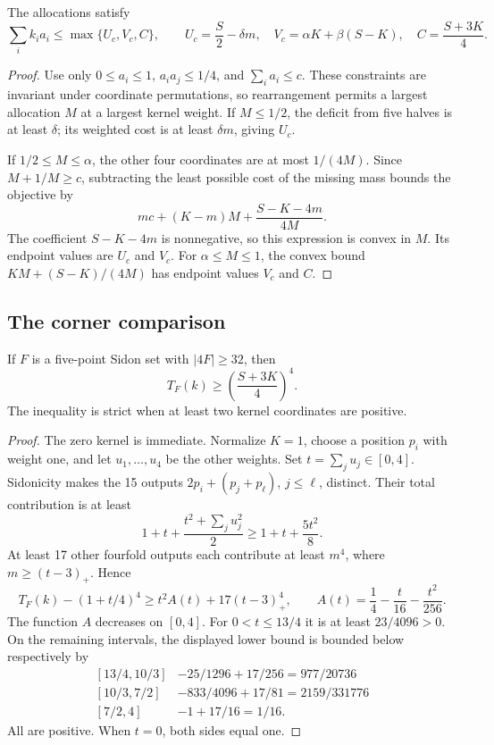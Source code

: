 \begin{lemma}\label{weighted-envelope}
The allocations satisfy
\[
 \sum_i k_i a_i\le\max\{U_c,V_c,C\},\qquad
 U_c=\frac S2-\delta m,\quad
 V_c=\alpha K+\beta(S-K),\quad C=\frac{S+3K}{4}.
\]
\end{lemma}
\begin{proof}
Use only $0\le a_i\le1$, $a_i a_j\le1/4$, and $\sum_i a_i\le c$.
These constraints are invariant under coordinate permutations, so
rearrangement permits a largest allocation $M$ at a largest kernel weight.
If $M\le1/2$, the deficit from five halves is at least $\delta$;
its weighted cost is at least $\delta m$, giving $U_c$.

If $1/2\le M\le\alpha$, the other four coordinates are at most
$1/(4M)$. Since $M+1/M\ge c$, subtracting the least possible cost
of the missing mass bounds the objective by
\[
 mc+(K-m)M+\frac{S-K-4m}{4M}.
\]
The coefficient $S-K-4m$ is nonnegative, so this expression is convex
in $M$. Its endpoint values are $U_c$ and $V_c$.
For $\alpha\le M\le1$, the convex bound
$KM+(S-K)/(4M)$ has endpoint values $V_c$ and $C$.
\end{proof}

\subsection{The corner comparison}

\begin{lemma}\label{weighted-corner}
If $F$ is a five-point Sidon set with $|4F|\ge32$, then
\[
 T_F(k)\ge\left(\frac{S+3K}{4}\right)^4.
\]
The inequality is strict when at least two kernel coordinates are positive.
\end{lemma}
\begin{proof}
The zero kernel is immediate. Normalize $K=1$, choose a position $p_i$
with weight one, and let $u_1,\ldots,u_4$ be the other weights.
Set $t=\sum_j u_j\in[0,4]$. Sidonicity makes the 15 outputs
$2p_i+(p_j+p_\ell)$, $j\le\ell$, distinct. Their total contribution
is at least
\[
 1+t+\frac{t^2+\sum_j u_j^2}{2}\ge1+t+\frac{5t^2}{8}.
\]
At least 17 other fourfold outputs each contribute at least $m^4$,
where $m\ge(t-3)_+$. Hence
\[
 T_F(k)-(1+t/4)^4
 \ge t^2 A(t)+17(t-3)_+^4,\qquad
 A(t)=\frac14-\frac t{16}-\frac{t^2}{256}.
\]
The function $A$ decreases on $[0,4]$. For $0<t\le13/4$ it is
at least $23/4096>0$. On the remaining intervals, the displayed
lower bound is bounded below respectively by
\[
\begin{array}{c|c}
 [13/4,10/3]&-25/1296+17/256=977/20736\\[2pt]
 [10/3,7/2]&-833/4096+17/81=2159/331776\\[2pt]
 [7/2,4]&-1+17/16=1/16.
\end{array}
\]
All are positive. When $t=0$, both sides equal one.
\end{proof}

